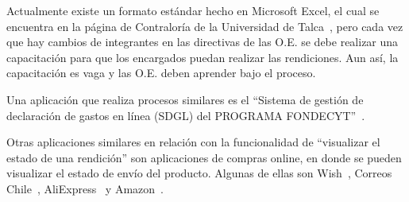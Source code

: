 Actualmente existe un formato estándar hecho en Microsoft Excel, el cual se encuentra en la página de Contraloría de la Universidad de Talca~\cite{6}, pero cada vez que hay cambios de integrantes en las directivas de las O.E. se debe realizar una capacitación para que los encargados puedan realizar las rendiciones. Aun así, la capacitación es vaga y las O.E. deben aprender bajo el proceso.

Una aplicación que realiza procesos similares es el ``Sistema de gestión de declaración de gastos en línea (SDGL) del PROGRAMA FONDECYT''~\cite{9}.

Otras aplicaciones similares en relación con la funcionalidad de ``visualizar el estado de una rendición'' son aplicaciones de compras online, en donde se pueden visualizar el estado de envío del producto. Algunas de ellas son Wish~\cite{10}, Correos Chile~\cite{11}, AliExpress~\cite{12} y  Amazon~\cite{13}.
